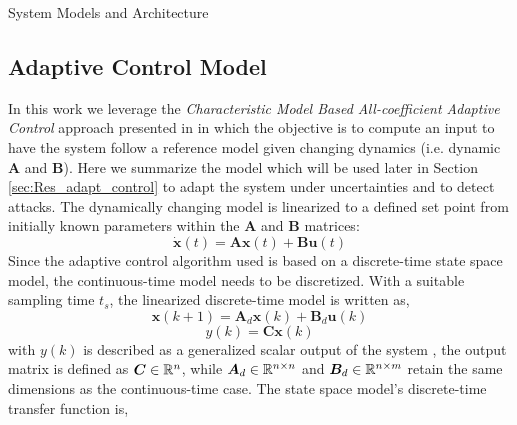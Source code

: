 \begin{section}{System Models and Architecture}
\subsection{Adaptive Control Model}
In this work we leverage the \textit{Characteristic Model Based All-coefficient Adaptive Control} approach presented in \cite{4106038} in which the objective is to compute an input to have the system follow a reference model given changing dynamics (i.e. dynamic $\bm{A}$ and  $\bm{B}$). Here we summarize the model which will be used later in Section \ref{sec:Res_adapt_control} to adapt the system under uncertainties and to detect attacks. The dynamically changing model is linearized to a defined set point from initially known parameters within the $\bm{A}$ and $\bm{B}$ matrices:
	\begin{equation}
	\dot{\bm{x}}(t) = \bm{A}\bm{x}(t) + \bm{B}\bm{u}(t)
	\end{equation}
Since the adaptive control algorithm used is based on a discrete-time state space model, the continuous-time model needs to be discretized. With a suitable sampling time $t_s$, the linearized discrete-time model is written as,
    \begin{equation}
	\bm{x}(k+1) = \bm{A}_d\bm{x}(k) + \bm{B}_d\bm{u}(k)
	\end{equation}
	\begin{equation}
	y(k)=\bm{C}\bm{x}(k)
	\end{equation}
with $y(k)$ is described as a generalized scalar output of the system , the output matrix is defined as $\bm{C} \in \mathbb{R}^{n}$, while $\bm{A}_d \in \mathbb{R}^{n\times n}$ and $\bm{B}_d \in \mathbb{R}^{n\times m}$ retain the same dimensions as the continuous-time case. The state space model's discrete-time transfer function is,


\end{section}
